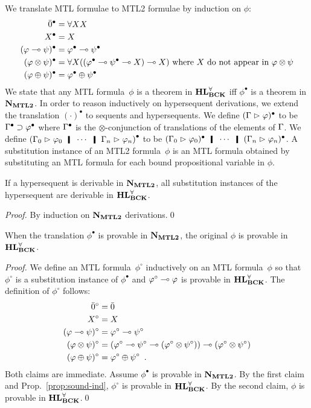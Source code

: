 \documentclass[envcountsame]{llncs}
\begin{document}
We translate MTL formulae to MTL2 formulae by
induction on $\phi$:
\begin{align*}
 \bar{0}^\bullet &= \forall XX \nonumber\\
 X^\bullet &= X \nonumber\\
 (\varphi\multimap\psi)^\bullet &= \varphi^\bullet \multimap \psi^\bullet\nonumber\\
 (\varphi\otimes\psi)^\bullet & = \forall
 X((\varphi^\bullet\multimap\psi^\bullet\multimap X)\multimap X) \text{ where }X\text{ do
 not appear in }\varphi\otimes\psi\nonumber\\
 (\varphi\oplus\psi)^\bullet &= \varphi^\bullet \oplus \psi^\bullet
\end{align*}
We state that any MTL formula~$\phi$ is a theorem in $\mathbf{HL}^\forall_{\mathbf{BCK}}$ iff
 $\phi^\bullet$ is a theorem in $\mathbf{N}_{\mathbf{MTL2}}$.
 In order to reason inductively on hypersequent derivations, we extend
 the translation $(\cdot)^\bullet$ to sequents and hypersequents.
 We define $(\Gamma\vartriangleright\varphi)^\bullet$ to be $\Gamma^\bullet\supset\varphi^\bullet$
 where
 $\Gamma^\bullet$ is the $\otimes$-conjunction of translations of the
 elements of $\Gamma$.
 We define
 $\left(\G_0\tr\phi_0\hmid\cdots\hmid\G_n\tr\phi_n\right)^\bullet$ to be
 $(\G_0\tr\phi_0)^\bullet\hmid\cdots \hmid (\G_n\tr\phi_n)^\bullet$.
A substitution instance of an MTL2 formula~$\phi$ is an MTL formula obtained by
substituting an MTL formula for each bound propositional variable in $\phi$.
 \begin{proposition}
  \label{prop:sound-ind}
  If a hypersequent is derivable in $\mathbf{N}_{\mathbf{MTL2}}$, all substitution instances
  of the hypersequent are derivable in $\mathbf{HL}^\forall_{\mathbf{BCK}}$.
 \end{proposition}
  \begin{proof}
   By induction on $\mathbf{N}_{\mathbf{MTL2}}$ derivations.\qed
  \end{proof}

 \begin{proposition}[Soundness]
  \label{prop:sound}
  When the translation $\phi^\bullet$ is provable in $\mathbf{N}_{\mathbf{MTL2}}$, the
  original $\phi$ is provable in $\mathbf{HL}^\forall_{\mathbf{BCK}}$.
 \end{proposition}
  \begin{proof}
   We define an MTL formula~$\phi^\circ$ inductively on an MTL
   formula~$\phi$ so that $\phi^\circ$ is a substitution instance of
   $\phi^\bullet$ and $\varphi^\circ\multimap\varphi$ is provable in
   $\mathbf{HL}^\forall_{\mathbf{BCK}}$.
   The definition of $\phi^\circ$ follows:
   \begin{align*}
    \bar 0^\circ&= \bar 0\\
    X^\circ &=X \\
    (\varphi\multimap\psi)^\circ&=\varphi^\circ\multimap\psi^\circ\\
    (\varphi\otimes\psi)^\circ &=
    (\varphi^\circ\multimap\psi^\circ\multimap(\varphi^\circ\otimes\psi^\circ))\multimap(\varphi^\circ\otimes\psi^\circ)\\
    (\varphi\oplus\psi)^\circ &= \varphi^\circ \oplus \psi^\circ\enspace.
   \end{align*}
   Both claims are immediate.  Assume $\phi^\bullet$
   is provable in $\mathbf{N}_{\mathbf{MTL2}}$.  By the first claim and Prop.~\ref{prop:sound-ind},
   $\phi^\circ$ is provable in $\mathbf{HL}^\forall_{\mathbf{BCK}}$.  By the second claim, $\phi$ is
   provable in $\mathbf{HL}^\forall_{\mathbf{BCK}}$.\qed
  \end{proof}
\end{document}
